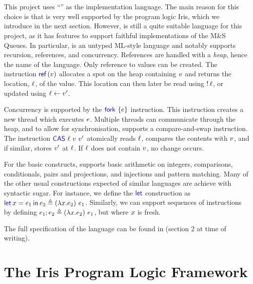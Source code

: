 \documentclass[a4paper, 10pt]{report}
\theoremstyle{definition}
\newcommand{\msq}{M\&S Queue}
\begin{document}
\section{\heaplang}
\label{Pre:section:heaplang}

This project uses ``\heaplang'' as the implementation language. The main reason for this choice is that \heaplang is very well supported by the program logic Iris, which we introduce in the next section. However, \heaplang is still a quite suitable language for this project, as it has features to support faithful implementations of the \msq{}s. In particular, \heaplang is an untyped ML-style language and notably supports recursion, references, and concurrency. References are handled with a \textit{heap}, hence the name of the language. Only reference to values can be created. The instruction $\Ref(\val)$ allocates a spot on the heap containing $v$ and returns the location, $\ell$, of the value. This location can then later be read using $\mathop{!} \ell$, or updated using $\ell \leftarrow v'$.

Concurrency is supported by the $\Fork{\expr}$ instruction. This instruction creates a new thread which executes $e$. Multiple threads can communicate through the heap, and to allow for synchronisation, \heaplang supports a compare-and-swap instruction. The instruction $\textsf{\color{blue} CAS} \ \ell \ v \ v'$ atomically reads $\ell$, compares the contents with $v$, and if similar, stores $v'$ at $\ell$. If $\ell$ does not contain $v$, no change occurs.

For the basic constructs, \heaplang supports basic arithmetic on integers, comparisons, conditionals, pairs and projections, and injections and pattern matching. Many of the other usual constructions expected of similar languages are achieve with syntactic sugar. For instance, we define the $\textsf{\color{blue} let}$ construction as $\Let \var = \expr_1 in \expr_2 \eqdef (\lambda{} \var . \expr_2) ~ \expr_1$. Similarly, we can support sequences of instructions by defining $e_1 ; e_2 \triangleq (\lambda{} x . e_2) ~ e_1$, but where $x$ is fresh.

The full specification of the language can be found in \citet{gentleiris} (section 2 at time of writing).

\section{The Iris Program Logic Framework}
\label{Pre:section:iris}
\end{document}
